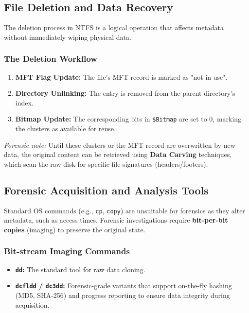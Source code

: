 \subsection{File Deletion and Data Recovery}
The deletion process in NTFS is a logical operation that affects metadata without immediately wiping physical data.

\subsubsection*{The Deletion Workflow}
\begin{enumerate}
    \item \textbf{MFT Flag Update:} The file's MFT record is marked as "not in use".
    \item \textbf{Directory Unlinking:} The entry is removed from the parent directory's index.
    \item \textbf{Bitmap Update:} The corresponding bits in \texttt{\$Bitmap} are set to 0, marking the clusters as available for reuse.
\end{enumerate}
\textit{Forensic note:} Until these clusters or the MFT record are overwritten by new data, the original content can be retrieved using \textbf{Data Carving} techniques, which scan the raw disk for specific file signatures (headers/footers).

\subsection{Forensic Acquisition and Analysis Tools}
Standard OS commands (e.g., \texttt{cp}, \texttt{copy}) are unsuitable for forensics as they alter metadata, such as access times. Forensic investigations require \textbf{bit-per-bit copies} (imaging) to preserve the original state.

\subsubsection*{Bit-stream Imaging Commands}
\begin{itemize}
    \item \textbf{\texttt{dd}:} The standard tool for raw data cloning.
    \item \textbf{\texttt{dcfldd} / \texttt{dc3dd}:} Forensic-grade variants that support on-the-fly hashing (MD5, SHA-256) and progress reporting to ensure data integrity during acquisition.
\end{itemize}

